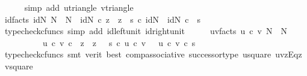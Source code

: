\begin{isabellebody}
\ \ \ \ \isamarkupfalse%
\ {\isacharparenleft}{\kern0pt}simp\ add{\isacharcolon}{\kern0pt}\ u{\isacharunderscore}{\kern0pt}triangle\ v{\isacharunderscore}{\kern0pt}triangle{\isacharparenright}{\kern0pt}\isanewline
\ \ \isamarkupfalse%
\ id{\isacharunderscore}{\kern0pt}facts{}{\isacharcolon}{\kern0pt}\ {\isachardoublequoteopen}id{\isacharparenleft}{\kern0pt}N{\isacharparenright}{\kern0pt}{\isacharcolon}{\kern0pt}\ N\ {\isasymrightarrow}\ N\ {\isasymand}\ id{\isacharparenleft}{\kern0pt}N{\isacharparenright}{\kern0pt}\ {\isasymcirc}\isactrlsub c\ z\ {\isacharequal}{\kern0pt}\ z\ {\isasymand}\ s\ {\isasymcirc}\isactrlsub c\ id{\isacharparenleft}{\kern0pt}N{\isacharparenright}{\kern0pt}\ {\isacharequal}{\kern0pt}\ id{\isacharparenleft}{\kern0pt}N{\isacharparenright}{\kern0pt}\ {\isasymcirc}\isactrlsub c\ \ s{\isachardoublequoteclose}\isanewline
\ \ \ \ \isamarkupfalse%
\ {\isacharparenleft}{\kern0pt}typecheck{\isacharunderscore}{\kern0pt}cfuncs{\isacharcomma}{\kern0pt}\ simp\ add{\isacharcolon}{\kern0pt}\ id{\isacharunderscore}{\kern0pt}left{\isacharunderscore}{\kern0pt}unit{}\ id{\isacharunderscore}{\kern0pt}right{\isacharunderscore}{\kern0pt}unit{}{\isacharparenright}{\kern0pt}\isanewline
\ \ \isamarkupfalse%
\ \isamarkupfalse%
\ uv{\isacharunderscore}{\kern0pt}facts{\isacharcolon}{\kern0pt}\ {\isachardoublequoteopen}u\ {\isasymcirc}\isactrlsub c\ v{\isacharcolon}{\kern0pt}\ N\ {\isasymrightarrow}\ N\ {\isasymand}\isanewline
\ \ \ \ \ \ \ \ \ \ {\isacharparenleft}{\kern0pt}u\ {\isasymcirc}\isactrlsub c\ v{\isacharparenright}{\kern0pt}\ {\isasymcirc}\isactrlsub c\ \ z\ {\isacharequal}{\kern0pt}\ z\ {\isasymand}\ \ s\ {\isasymcirc}\isactrlsub c\ {\isacharparenleft}{\kern0pt}u\ {\isasymcirc}\isactrlsub c\ v{\isacharparenright}{\kern0pt}\ {\isacharequal}{\kern0pt}\ \ {\isacharparenleft}{\kern0pt}u\ {\isasymcirc}\isactrlsub c\ v{\isacharparenright}{\kern0pt}\ {\isasymcirc}\isactrlsub c\ s{\isachardoublequoteclose}\isanewline
\ \ \ \ \isamarkupfalse%
\ {\isacharparenleft}{\kern0pt}typecheck{\isacharunderscore}{\kern0pt}cfuncs{\isacharcomma}{\kern0pt}\ smt\ {\isacharparenleft}{\kern0pt}verit{\isacharcomma}{\kern0pt}\ best{\isacharparenright}{\kern0pt}\ comp{\isacharunderscore}{\kern0pt}associative{}\ successor{\isacharunderscore}{\kern0pt}type\ u{\isacharunderscore}{\kern0pt}square\ uvzEqz\ v{\isacharunderscore}{\kern0pt}square{\isacharparenright}{\kern0pt}\isanewline
\ \isamarkupfalse%
\ \isamarkupfalse%

\end{isabellebody}
